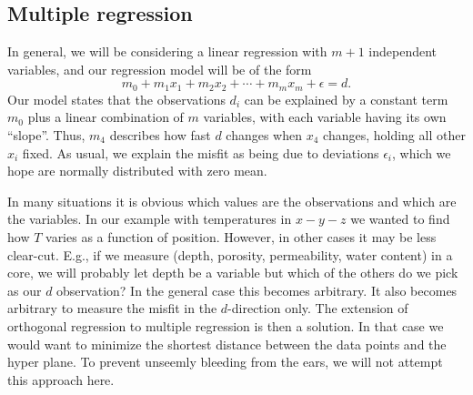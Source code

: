\subsection{Multiple regression}

In general, we will be considering a linear regression 
with $m+1$ independent variables, and our regression model will be of the form
\begin{equation}
m_0 + m_1 x_1 +  m_2 x_2 + \cdots + m_m x_m + \epsilon = d.
 \end{equation}	 	
Our model states that the observations $d_i$ can be explained by a constant term $m_0$ plus a linear 
combination of $m$ variables, with each variable having its own ``slope''.  Thus, $m_4$ describes how 
fast $d$ changes when $x_4$ changes, holding all other $x_i$ fixed.  As usual, we explain the misfit as 
being due to deviations $\epsilon_i$, which we hope are normally distributed with zero mean.
	
In many situations it is obvious which values are the observations and which are the 
variables.  In our example with temperatures in $x-y-z$ we wanted to  find how $T$ varies as a 
function of position.  However, in other cases it may be less clear-cut.  E.g., if we measure (depth, 
porosity, permeability, water content) in a core, we will probably let depth be a variable but which 
of the others do we pick as our $d$ observation?  In the general case this becomes arbitrary.  It also becomes 
arbitrary to measure the misfit in the $d$-direction only.  The extension of orthogonal regression to 
multiple regression is then a solution. In that case we would want to minimize the shortest distance 
between the data points and the hyper plane.  To prevent unseemly bleeding from the ears, we will not attempt this approach here.
	
